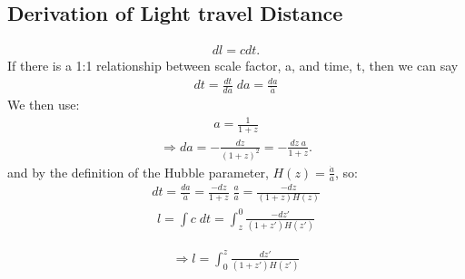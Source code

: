 \documentclass[pdf,color]{UoBnote}
\begin{document}
\newpage

\subsection{Derivation of Light travel Distance}

\begin{align}
			dl = cdt.
\end{align}
If there is a 1:1 relationship between scale factor, a, and time, t, then we can say 
\begin{align}
			dt = \frac{dt}{da} \; da = \frac{da}{\dot{a}}
\end{align}
We then use:
\begin{align}
			 a = \frac{1}{1+z} 
\end{align}
\begin{align}
	\Rightarrow da = -\frac{dz}{(1+z)^2} = -\frac{dz \; a}{1+z}.
\end{align}
and by the definition of the Hubble parameter, $H(z) = \frac{\dot{a}}{a}$, so:
\begin{align}
			dt = \frac{da}{\dot{a}} = \frac{-dz }{1+z} \; \frac{a}{\dot{a}} = \frac {-dz}{(1+z) H(z)}
\end{align}
\begin{align}
			l = \int c \; dt = \int_z^0 \frac {-dz'}{(1+z') H(z')}
\end{align}

\begin{align}
		\Rightarrow l = \int_0^z \frac {dz'}{(1+z') H(z')}
\end{align}



\end{document}
